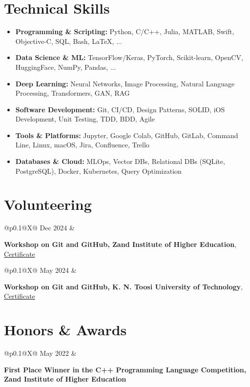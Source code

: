 \documentclass[letter,10pt]{article}
\makeatletter
\newcommand{\cventry}[2]{%
    \noindent
    \begin{tabularx}{\textwidth}{%
        @{}p{0.1\textwidth}@{\hspace{0.2cm}}X@{}
    }
        #1 &
        \begin{minipage}[t]{\linewidth}
            #2
        \end{minipage}
    \end{tabularx}%
    \par\vspace{1.1em}%
}
\makeatother
\begin{document}
\section*{Technical Skills}
\begin{itemize}[label={}, nosep, leftmargin=0pt, itemsep=4.5pt]
\item \textbf{Programming \& Scripting:} Python, C/C++, Julia, MATLAB, Swift, Objective-C, SQL, Bash, LaTeX, ...
\item \textbf{Data Science \& ML:} TensorFlow/Keras, PyTorch, Scikit-learn, OpenCV, HuggingFace, NumPy, Pandas, ...
\item \textbf{Deep Learning:} Neural Networks, Image Processing, Natural Language Processing, Transformers, GAN, RAG
\item \textbf{Software Development:} Git, CI/CD, Design Patterns, SOLID, iOS Development, Unit Testing, TDD, BDD, Agile
\item \textbf{Tools \& Platforms:} Jupyter, Google Colab, GitHub, GitLab, Command Line, Linux, macOS, Jira, Confluence, Trello
\item \textbf{Databases \& Cloud:} MLOps, Vector DBs, Relational DBs (SQLite, PostgreSQL), Docker, Kubernetes, Query Optimization
\end{itemize}

\section*{Volunteering}

\cventry{Dec 2024}{
    \textbf{Workshop on Git and GitHub, Zand Institute of Higher Education}, { }\href{https://github.com/karami-mehdi/CV/blob/main/Assets/certificate-of-workshop-participation-karami-mehdi-zand-ihe.pdf}{ Certificate }
}

\cventry{May 2024}{
    \textbf{Workshop on Git and GitHub, K. N. Toosi University of Technology}, { }\href{https://github.com/karami-mehdi/CV/blob/main/Assets/certificate-of-workshop-participation-karami-mehdi.pdf}{ Certificate }
}

\section*{Honors \& Awards}
\cventry{May 2022}{
    \textbf{First Place Winner in the C++ Programming Language Competition, Zand Institute of Higher Education}
}
\end{document}
